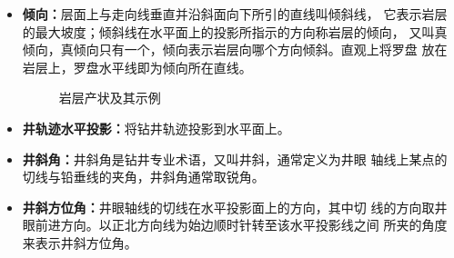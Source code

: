 \documentclass[a4paper,twoside]{ctexart}
\begin{document}
\begin{itemize}
\item \textbf{倾向：}层面上与走向线垂直并沿斜面向下所引的直线叫倾斜线，
  它表示岩层的最大坡度；倾斜线在水平面上的投影所指示的方向称岩层的倾向，
  又叫真倾向，真倾向只有一个，倾向表示岩层向哪个方向倾斜。直观上将罗盘
  放在岩层上，罗盘水平线即为倾向所在直线。

\begin{figure}[htbp]
  \centering
  \hspace{2cm}
  
  \caption{岩层产状及其示例}
  \label{fig:岩层产状及其示例}
\end{figure}

\item \textbf{井轨迹水平投影：}将钻井轨迹投影到水平面上。
\item \textbf{井斜角：}井斜角是钻井专业术语，又叫井斜，通常定义为井眼
  轴线上某点的切线与铅垂线的夹角，井斜角通常取锐角。
\item \textbf{井斜方位角：}井眼轴线的切线在水平投影面上的方向，其中切
  线的方向取井眼前进方向。以正北方向线为始边顺时针转至该水平投影线之间
  所夹的角度来表示井斜方位角。


\end{itemize}
\end{document}
